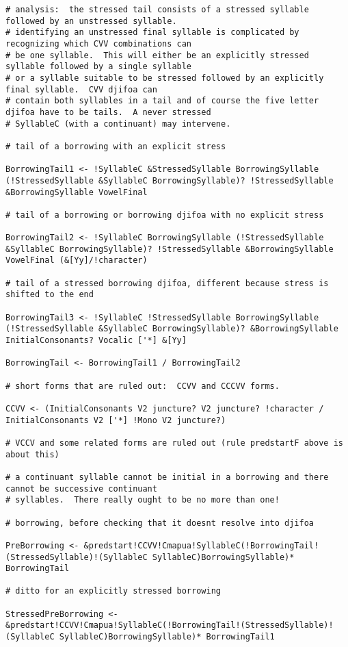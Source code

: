 \documentclass[12pt]{book}
\begin{document}
{\begin{verbatim}
# analysis:  the stressed tail consists of a stressed syllable followed by an unstressed syllable.
# identifying an unstressed final syllable is complicated by recognizing which CVV combinations can
# be one syllable.  This will either be an explicitly stressed syllable followed by a single syllable
# or a syllable suitable to be stressed followed by an explicitly final syllable.  CVV djifoa can
# contain both syllables in a tail and of course the five letter djifoa have to be tails.  A never stressed
# SyllableC (with a continuant) may intervene.

# tail of a borrowing with an explicit stress

BorrowingTail1 <- !SyllableC &StressedSyllable BorrowingSyllable (!StressedSyllable &SyllableC BorrowingSyllable)? !StressedSyllable &BorrowingSyllable VowelFinal

# tail of a borrowing or borrowing djifoa with no explicit stress

BorrowingTail2 <- !SyllableC BorrowingSyllable (!StressedSyllable &SyllableC BorrowingSyllable)? !StressedSyllable &BorrowingSyllable VowelFinal (&[Yy]/!character)

# tail of a stressed borrowing djifoa, different because stress is shifted to the end

BorrowingTail3 <- !SyllableC !StressedSyllable BorrowingSyllable (!StressedSyllable &SyllableC BorrowingSyllable)? &BorrowingSyllable InitialConsonants? Vocalic ['*] &[Yy]

BorrowingTail <- BorrowingTail1 / BorrowingTail2

# short forms that are ruled out:  CCVV and CCCVV forms.

CCVV <- (InitialConsonants V2 juncture? V2 juncture? !character / InitialConsonants V2 ['*] !Mono V2 juncture?)

# VCCV and some related forms are ruled out (rule predstartF above is about this)

# a continuant syllable cannot be initial in a borrowing and there cannot be successive continuant
# syllables.  There really ought to be no more than one!

# borrowing, before checking that it doesnt resolve into djifoa

PreBorrowing <- &predstart!CCVV!Cmapua!SyllableC(!BorrowingTail!(StressedSyllable)!(SyllableC SyllableC)BorrowingSyllable)* BorrowingTail

# ditto for an explicitly stressed borrowing

StressedPreBorrowing <- &predstart!CCVV!Cmapua!SyllableC(!BorrowingTail!(StressedSyllable)!(SyllableC SyllableC)BorrowingSyllable)* BorrowingTail1


\end{verbatim}}
\end{document}
